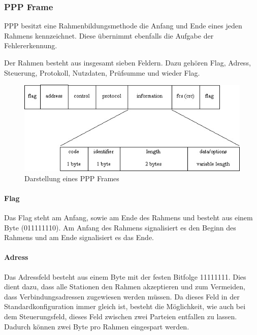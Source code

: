 \documentclass[12pt, a4paper, ngerman]{article}
\begin{document}
\subsubsection{PPP Frame}

PPP besitzt eine Rahmenbildungsmethode die Anfang und Ende eines jeden Rahmens kennzeichnet. Diese übernimmt ebenfalls die Aufgabe der Fehlererkennung.

Der Rahmen besteht aus insgesamt sieben Feldern. Dazu gehören Flag, Adress, Steuerung,  Protokoll, Nutzdaten, Prüfsumme und wieder Flag.

\begin{figure}[H]
	\centering
	\includegraphics[width=1\textwidth]{Grafiken/ppp-frame.jpg}	
	\caption{Darstellung eines PPP Frames \cite{ppp-lcp-info.header}}
	\label{ppp_frame}
\end{figure}

\paragraph{Flag}

Das Flag steht am Anfang, sowie am Ende des Rahmens und besteht aus einem Byte (011111110). Am Anfang des Rahmens signalisiert es den Beginn des Rahmens und am Ende signalisiert es das Ende.


\paragraph{Adress}

Das Adressfeld besteht aus einem Byte mit der festen Bitfolge 11111111. Dies dient dazu, dass alle Stationen den Rahmen akzeptieren und zum Vermeiden, dass Verbindungsadressen zugewiesen werden müssen. Da dieses Feld in der Standardkonfiguration immer gleich ist, besteht die Möglichkeit, wie auch bei dem Steuerungsfeld, dieses Feld zwischen zwei Parteien entfallen zu lassen. Dadurch können zwei Byte pro Rahmen eingespart werden.
\end{document}
